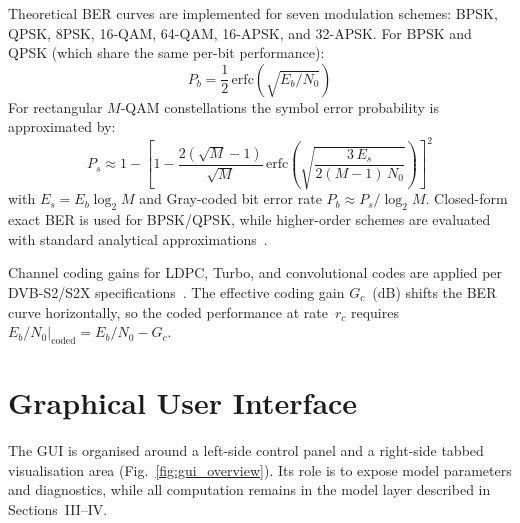 \documentclass[conference]{IEEEtran}
\begin{document}
Theoretical BER curves are implemented for seven modulation schemes:
BPSK, QPSK, 8PSK, 16-QAM, 64-QAM, 16-APSK, and 32-APSK.  For BPSK
and QPSK (which share the same per-bit performance):
\begin{equation}
  P_b = \frac{1}{2}\,\mathrm{erfc}\!\left(\sqrt{E_b/N_0}\right)
  \label{eq:bpsk_ber}
\end{equation}
For rectangular $M$-QAM constellations the symbol error probability is
approximated by:
\begin{equation}
  P_s \approx 1 - \left[1 - \frac{2(\sqrt{M}-1)}{\sqrt{M}}\,
    \mathrm{erfc}\!\left(\sqrt{\frac{3\,E_s}{2(M-1)\,N_0}}\right)
    \right]^{\!2}
  \label{eq:mqam_ser}
\end{equation}
with $E_s = E_b \log_2 M$ and Gray-coded bit error rate
$P_b \approx P_s / \log_2 M$.
Closed-form exact BER is used for BPSK/QPSK, while higher-order
schemes are evaluated with standard analytical approximations~\cite{sklar2001}.

Channel coding gains for LDPC, Turbo, and convolutional codes are applied
per DVB-S2/S2X specifications~\cite{dvbs2}.  The effective coding gain
$G_c$~(dB) shifts the BER curve horizontally, so the coded performance
at rate~$r_c$ requires $E_b/N_0 |_{\text{coded}} = E_b/N_0 - G_c$.


\section{Graphical User Interface}
\label{sec:gui}

The GUI is organised around a left-side control panel and a right-side
tabbed visualisation area (Fig.~\ref{fig:gui_overview}). Its role is to expose
model parameters and diagnostics, while all computation remains in the model
layer described in Sections~III--IV.
\end{document}
